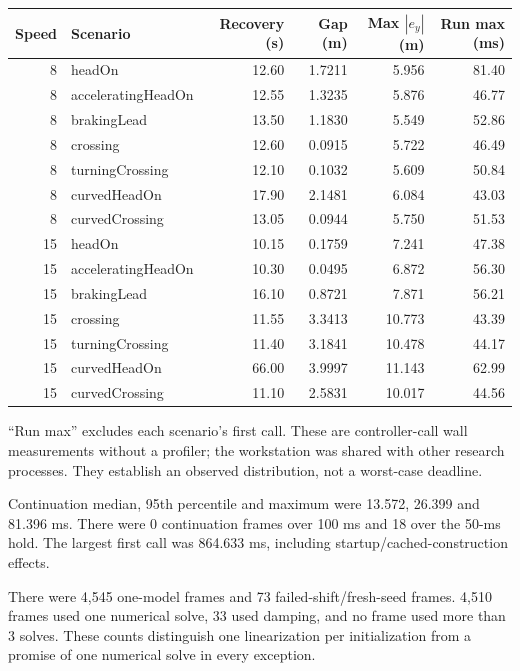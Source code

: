 \documentclass[10pt]{article}
\begin{document}
\begin{center}\small
\begin{tabular}{rlrrrr}
\toprule
Speed & Scenario & Recovery (s) & Gap (m) & Max $|e_y|$ (m) & Run max (ms)\\
\midrule
8 & headOn & 12.60 & 1.7211 & 5.956 & 81.40\\
8 & acceleratingHeadOn & 12.55 & 1.3235 & 5.876 & 46.77\\
8 & brakingLead & 13.50 & 1.1830 & 5.549 & 52.86\\
8 & crossing & 12.60 & 0.0915 & 5.722 & 46.49\\
8 & turningCrossing & 12.10 & 0.1032 & 5.609 & 50.84\\
8 & curvedHeadOn & 17.90 & 2.1481 & 6.084 & 43.03\\
8 & curvedCrossing & 13.05 & 0.0944 & 5.750 & 51.53\\
15 & headOn & 10.15 & 0.1759 & 7.241 & 47.38\\
15 & acceleratingHeadOn & 10.30 & 0.0495 & 6.872 & 56.30\\
15 & brakingLead & 16.10 & 0.8721 & 7.871 & 56.21\\
15 & crossing & 11.55 & 3.3413 & 10.773 & 43.39\\
15 & turningCrossing & 11.40 & 3.1841 & 10.478 & 44.17\\
15 & curvedHeadOn & 66.00 & 3.9997 & 11.143 & 62.99\\
15 & curvedCrossing & 11.10 & 2.5831 & 10.017 & 44.56\\
\bottomrule
\end{tabular}\end{center}
``Run max'' excludes each scenario's first call. These are controller-call wall
measurements without a profiler; the workstation was shared with other research
processes. They establish an observed distribution, not a worst-case deadline.

Continuation median, 95th percentile and maximum were 13.572, 26.399 and 81.396 ms. There were 0 continuation frames over 100 ms and 18 over the 50-ms hold. The largest first call was 864.633 ms, including startup/cached-construction effects.

There were 4,545 one-model frames and 73 failed-shift/fresh-seed frames. 4,510 frames used one numerical solve, 33 used damping, and no frame used more than 3 solves. These counts distinguish one linearization per initialization from a promise of one numerical solve in every exception.
\end{document}
